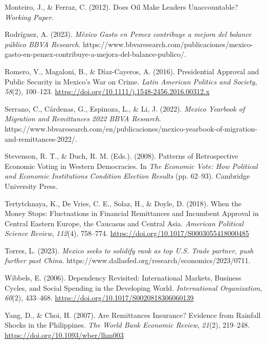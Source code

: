 \documentclass[
]{article}
\newlength{\cslhangindent}
\newlength{\cslentryspacingunit} %
\newenvironment{CSLReferences}[2] %
 {%
  \setlength{\parindent}{0pt}
  \ifodd #1
  \let\oldpar\par
  \def\par{\hangindent=\cslhangindent\oldpar}
  \fi
  \setlength{\parskip}{#2\cslentryspacingunit}
 }%
 {}
\begin{document}
\begin{CSLReferences}{1}{0}
\leavevmode{}%
Monteiro, J., \& Ferraz, C. (2012). Does {Oil Make Leaders
Unaccountable}? \emph{Working Paper}.

\leavevmode{}%
Rodríguez, A. (2023). \emph{{M{é}xico \textbar{} Gasto en Pemex
contribuye a mejora del balance p{ú}blico \textbar{} BBVA Research}}.
https://www.bbvaresearch.com/publicaciones/mexico-gasto-en-pemex-contribuye-a-mejora-del-balance-publico/.

\leavevmode{}%
Romero, V., Magaloni, B., \& Díaz-Cayeros, A. (2016). Presidential
{Approval} and {Public Security} in {Mexico}'s {War} on {Crime}.
\emph{Latin American Politics and Society}, \emph{58}(2), 100--123.
\url{https://doi.org/10.1111/j.1548-2456.2016.00312.x}

\leavevmode{}%
Serrano, C., Cárdenas, G., Espinoza, L., \& Li, J. (2022). \emph{Mexico
\textbar{} {Yearbook} of {Migration} and {Remittances} 2022 \textbar{}
{BBVA Research}}.
https://www.bbvaresearch.com/en/publicaciones/mexico-yearbook-of-migration-and-remittances-2022/.

\leavevmode{}%
Stevenson, R. T., \& Duch, R. M. (Eds.). (2008). Patterns of
{Retrospective Economic Voting} in {Western Democracies}. In \emph{The
{Economic Vote}: {How Political} and {Economic Institutions Condition
Election Results}} (pp. 62--93). {Cambridge University Press}.

\leavevmode{}%
Tertytchnaya, K., De Vries, C. E., Solaz, H., \& Doyle, D. (2018). When
the {Money Stops}: {Fluctuations} in {Financial Remittances} and
{Incumbent Approval} in {Central Eastern Europe}, the {Caucasus} and
{Central Asia}. \emph{American Political Science Review}, \emph{112}(4),
758--774. \url{https://doi.org/10.1017/S0003055418000485}

\leavevmode{}%
Torres, L. (2023). \emph{Mexico seeks to solidify rank as top {U}.{S}.
Trade partner, push further past {China}}.
https://www.dallasfed.org/research/economics/2023/0711.

\leavevmode{}%
Wibbels, E. (2006). Dependency {Revisited}: {International Markets},
{Business Cycles}, and {Social Spending} in the {Developing World}.
\emph{International Organization}, \emph{60}(2), 433--468.
\url{https://doi.org/10.1017/S0020818306060139}

\leavevmode{}%
Yang, D., \& Choi, H. (2007). Are {Remittances Insurance}? {Evidence}
from {Rainfall Shocks} in the {Philippines}. \emph{The World Bank
Economic Review}, \emph{21}(2), 219--248.
\url{https://doi.org/10.1093/wber/lhm003}

\end{CSLReferences}
\end{document}
